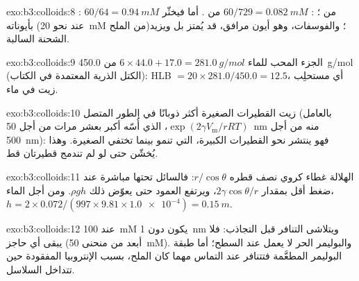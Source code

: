 \begin{solution}{exo:b3:colloids:8}
: $60/64 = \qty{0.94}{mM}$ من ؛ : $60/729 = \qty{0.082}{mM}$ من . أما 
فيخثّر بأيوناته  (عند نحو \qty{20}{mM} من الملح)؛ والفوسفات، وهو أيون
مرافق، قد يُمتز بل ويزيد الشحنة السالبة.
\end{solution}

\begin{solution}{exo:b3:colloids:9}
الجزء المحب للماء $6 \times 44.0 + 17.0 = \qty{281.0}{g/mol}$ من \qty{450.0}{g/mol} (الكتل الذرية المعتمدة في الكتاب):
HLB $= 20 \times 281.0/450.0 = 12.5$، أي مستحلِب زيت في ماء.
\end{solution}

\begin{solution}{exo:b3:colloids:10}
زيت القطيرات الصغيرة أكثر ذوبانًا في الطور المتصل (بالعامل
$\exp(2\gamma V_{\mathrm m}/rRT)$، الذي أُسّه أكبر بعشر مرات من أجل \qty{50}{nm} منه من أجل \qty{500}{nm}): فهو
ينتشر نحو القطيرات الكبيرة، التي تنمو بينما تختفي الصغيرة. وهذا
 يُخشّن  حتى لو لم تندمج قطيرتان قط.
\end{solution}

\begin{solution}{exo:b3:colloids:11}
الهلالة غطاء كروي نصف قطره $r/\cos\theta$: فالسائل تحتها مباشرة عند
ضغط أقل بمقدار $2\gamma\cos\theta/r$، ويرتفع العمود حتى يعوّض ذلك $\rho gh$. ومن أجل الماء،
$h = 2 \times 0.072/(997 \times 9.81 \times \num{1.0e-4}) = \qty{0.15}{m}$.
\end{solution}

\begin{solution}{exo:b3:colloids:12}
عند \qty{100}{mM} يكون  دون \qty{1}{nm} ويتلاشى التنافر قبل
التجاذب: فلا يبقى أي حاجز (أبعد من منحنى \qty{50}{mM}). والبوليمر الحر لا
يعمل عند السطح؛ أما طبقة البوليمر المطعَّمة فتتنافر عند التماس مهما كان
الملح، بسبب الإنتروبيا المفقودة حين تتداخل السلاسل.
\end{solution}

